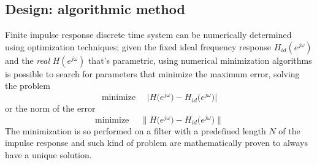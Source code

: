 	\subsection{Design: algorithmic method}
		Finite impulse response discrete time system can be numerically determined using optimization techniques; given the fixed ideal frequency response $H_{id}(e^{j\omega})$ and the \textit{real} $H(e^{j\omega})$ that's parametric, using numerical minimization algorithms is possible to search for parameters that minimize the maximum error, solving the problem
		\[ \textrm{minimize } \quad \Big| H\big(e^{j\omega}\big) - H_{id} \big(e^{j\omega}\big) \Big| \]
		or the norm of the error
		\[ \textrm{minimize } \quad \Big\| H\big(e^{j\omega}\big) - H_{id} \big(e^{j\omega}\big) \Big\| \]
		The minimization is so performed on a filter with a predefined length $N$ of the impulse response and such kind of problem are mathematically proven to always have a unique solution.
		
		
		
		
		
